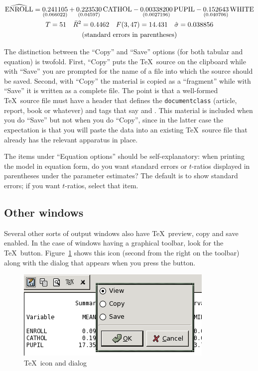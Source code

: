 
\begin{gather}
\widehat{\rm ENROLL} = 
\underset{(0.066022)}{0.241105}
+\underset{(0.04597)}{0.223530}\,\mbox{CATHOL}
-\underset{(0.0027196)}{0.00338200}\,\mbox{PUPIL}
-\underset{(0.040706)}{0.152643}\,\mbox{WHITE}
 \notag \\
T = 51 \quad \bar{R}^2 = 0.4462 \quad F(3,47) = 14.431 \quad \hat{\sigma} = 0.038856\notag \\
\centerline{(standard errors in parentheses)} \notag
\end{gather}

The distinction between the ``Copy'' and ``Save'' options (for both
tabular and equation) is twofold.  First, ``Copy'' puts the \TeX\
source on the clipboard while with ``Save'' you are prompted for the
name of a file into which the source should be saved.  Second, with
``Copy'' the material is copied as a ``fragment'' while with ``Save''
it is written as a complete file.  The point is that a well-formed
\TeX\ source file must have a header that defines the
\texttt{documentclass} (article, report, book or whatever) and tags
that say \verb|| and \verb||.  This
material is included when you do ``Save'' but not when you do
``Copy'', since in the latter case the expectation is that you will
paste the data into an existing \TeX\ source file that already has the
relevant apparatus in place.

The items under ``Equation options'' should be self-explanatory: when
printing the model in equation form, do you want standard errors or
$t$-ratios displayed in parentheses under the parameter estimates?
The default is to show standard errors; if you want $t$-ratios, select
that item.  

\subsection{Other windows}

Several other sorts of output windows also have \TeX\ preview, copy
and save enabled.  In the case of windows having a graphical toolbar,
look for the \TeX\ button.  Figure~\ref{fig:tex-icon} shows this icon
(second from the right on the toolbar) along with the dialog that
appears when you press the button.

\begin{figure}[htbp]
  \caption{\TeX\ icon and dialog}
  \label{fig:tex-icon}
    \begin{center}
      \includegraphics[scale=0.75]{figures/texdialog} 
    \end{center}
\end{figure}

